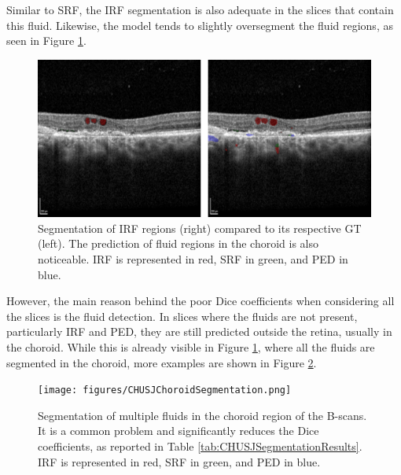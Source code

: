 Similar to SRF, the IRF segmentation is also adequate in the slices that contain this fluid. Likewise, the model tends to slightly oversegment the fluid regions, as seen in Figure \ref{fig:CHUSJIRFSegmentation}. 

\begin{figure}[!ht]
	\centering
	\includegraphics[width=0.60\linewidth]{figures/CHUSJIRFSegmentation.png}
	\caption{Segmentation of IRF regions (right) compared to its respective GT (left). The prediction of fluid regions in the choroid is also noticeable. IRF is represented in red, SRF in green, and PED in blue.}
	\label{fig:CHUSJIRFSegmentation}
\end{figure}

However, the main reason behind the poor Dice coefficients when considering all the slices is the fluid detection. In slices where the fluids are not present, particularly IRF and PED, they are still predicted outside the retina, usually in the choroid. While this is already visible in Figure \ref{fig:CHUSJIRFSegmentation}, where all the fluids are segmented in the choroid, more examples are shown in Figure \ref{fig:CHUSJChoroidSegmentation}.

\begin{figure}[b]
	\centering	\texttt{[image: figures/CHUSJChoroidSegmentation.png]}
	\caption{Segmentation of multiple fluids in the choroid region of the B-scans. It is a common problem and significantly reduces the Dice coefficients, as reported in Table \ref{tab:CHUSJSegmentationResults}. IRF is represented in red, SRF in green, and PED in blue.}
	\label{fig:CHUSJChoroidSegmentation}
\end{figure}

